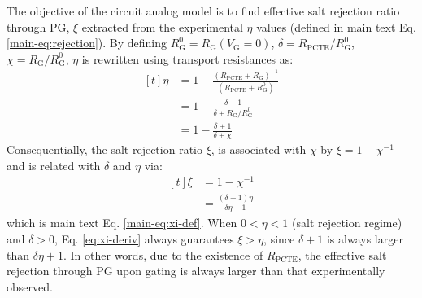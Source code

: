 \documentclass[manuscript=suppinfo,email=true, hyperref=true, keywords=false]{achemso}
\begin{document}
The objective of the circuit analog model is to find effective salt
rejection ratio through PG, $\xi$ extracted from the experimental
$\eta$ values (defined in main text Eq. \ref{main-eq:rejection}). By
defining $R_{\mathrm{G}}^{0}=R_{\mathrm{G}}(V_{\mathrm{G}}=0)$,
$\delta = R_{\mathrm{PCTE}} / R_{\mathrm{G}}^{0}$,
$\chi = R_{\mathrm{G}}/R_{\mathrm{G}}^{0}$, $\eta$ is rewritten using
transport resistances as:
\begin{equation}
  \begin{aligned}[t]
      \label{eq:eta-R}
  \eta &= 1 - {\displaystyle
    \frac{(R_{\mathrm{PCTE}} + R_{\mathrm{G}})^{-1}}
    {(R_{\mathrm{PCTE}} + R_{\mathrm{G}}^{0})}} \\
    &= 1 - \frac{\delta + 1}{\delta + R_{\mathrm{G}}/R_{\mathrm{G}}^{0}} \\
    &= 1 - \frac{\delta + 1}{\delta + \chi}
  \end{aligned}
\end{equation}
Consequentially, the
salt rejection ratio $\xi$, is associated with $\chi$ by
$\xi = 1 - \chi^{-1}$ and is related with $\delta$ and $\eta$ via:
\begin{equation}
  \label{eq:xi-deriv}
  \begin{aligned}[t]
    \xi &= 1 - \chi^{-1} \\
    &= \frac{(\delta + 1) \eta}{\delta\eta + 1}
  \end{aligned}
\end{equation}
which is main text Eq. \ref{main-eq:xi-def}. When $0<\eta<1$ (salt
rejection regime) and $\delta>0$, Eq. \ref{eq:xi-deriv} always
guarantees $\xi>\eta$, since $\delta + 1$ is always larger than
$\delta\eta + 1$. In other words, due to the existence of
$R_{\mathrm{PCTE}}$, the effective salt rejection through PG upon
gating is always larger than that experimentally observed.
\end{document}
